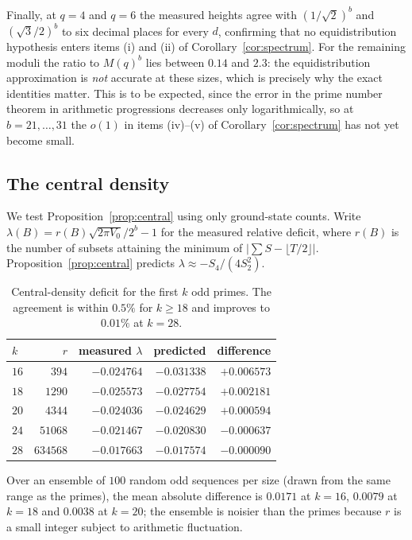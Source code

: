\documentclass[11pt,a4paper]{article}
\theoremstyle{plain}
\theoremstyle{definition}
\theoremstyle{remark}
\begin{document}
Finally, at $q=4$ and $q=6$ the measured heights agree with
$(1/\sqrt2)^{b}$ and $(\sqrt3/2)^{b}$ to six decimal places for every $d$,
confirming that no equidistribution hypothesis enters items (i) and (ii) of
Corollary~\ref{cor:spectrum}. For the remaining moduli the ratio to $M(q)^{b}$
lies between $0.14$ and $2.3$: the equidistribution approximation is
\emph{not} accurate at these sizes, which is precisely why the exact
identities matter. This is to be expected, since the error in the prime number
theorem in arithmetic progressions decreases only logarithmically, so at
$b=21,\dots,31$ the $o(1)$ in items (iv)--(v) of
Corollary~\ref{cor:spectrum} has not yet become small.

\subsection{The central density}\label{sec:m2num}

We test Proposition~\ref{prop:central} using only ground-state counts. Write
$\lambda(B)=r(B)\sqrt{2\pi V_0}/2^{b}-1$ for the measured relative deficit,
where $r(B)$ is the number of subsets attaining the minimum of
$|\sum S-\lfloor T/2\rfloor|$. Proposition~\ref{prop:central} predicts
$\lambda\approx-S_4/(4S_2^{2})$.

\begin{table}[htbp]
\centering
\begin{tabular}{lrrrr}
\toprule
$k$ & $r$ & measured $\lambda$ & predicted & difference\\
\midrule
$16$ & $394$    & $-0.024764$ & $-0.031338$ & $+0.006573$\\
$18$ & $1290$   & $-0.025573$ & $-0.027754$ & $+0.002181$\\
$20$ & $4344$   & $-0.024036$ & $-0.024629$ & $+0.000594$\\
$24$ & $51068$  & $-0.021467$ & $-0.020830$ & $-0.000637$\\
$28$ & $634568$ & $-0.017663$ & $-0.017574$ & $-0.000090$\\
\bottomrule
\end{tabular}
\caption{Central-density deficit for the first $k$ odd primes. The agreement is
within $0.5\%$ for $k\ge18$ and improves to $0.01\%$ at $k=28$.}
\label{tab:central}
\end{table}

Over an ensemble of $100$ random odd sequences per size (drawn from the same
range as the primes), the mean absolute difference is $0.0171$ at $k=16$,
$0.0079$ at $k=18$ and $0.0038$ at $k=20$; the ensemble is noisier than the
primes because $r$ is a small integer subject to arithmetic fluctuation.
\end{document}
